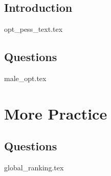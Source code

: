 \documentclass{exam}
\begin{document}
\subsection{Introduction}
{opt_pess_text.tex}
\subsection{Questions}
\begin{questions}
{male_opt.tex}
\end{questions}

\section{More Practice}
\subsection{Questions}
\begin{questions}
{global_ranking.tex}
\end{questions}


\end{document}
